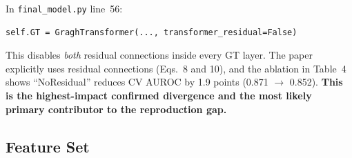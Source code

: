 \documentclass[10pt, a4paper]{article}
\newcommand{\warn}[1]{\textcolor{warnorange}{\textbf{#1}}}
\newcommand{\code}[1]{\texttt{\small #1}}
\begin{document}
\begin{tcolorbox}[colback=warnbg, colframe=warnorange,
    title=\warn{Critical GT Divergence: \code{transformer\_residual=False}}]
In \code{final\_model.py} line~56:
\begin{verbatim}
self.GT = GraghTransformer(..., transformer_residual=False)
\end{verbatim}
This disables \emph{both} residual connections inside every GT layer.
The paper explicitly uses residual connections (Eqs.\ 8 and 10), and the ablation in Table~4
shows ``NoResidual'' reduces CV AUROC by 1.9 points (0.871 $\to$ 0.852).
\textbf{This is the highest-impact confirmed divergence and the most likely
primary contributor to the reproduction gap.}
\end{tcolorbox}

\subsection{Feature Set}
\end{document}
